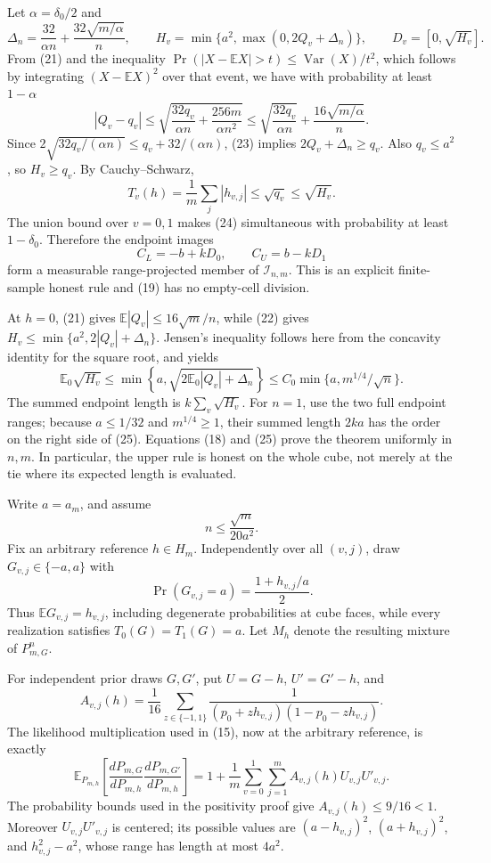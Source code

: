 Let \(\alpha=\delta_0/2\) and
\[
 \Delta_n=\frac{32}{\alpha n}+\frac{32\sqrt{m/\alpha}}n,
 \qquad
 H_v=\min\{a^2,\max(0,2Q_v+\Delta_n)\},
 \qquad D_v=[0,\sqrt{H_v}].                                             \tag{22}
\]
From (21) and the inequality
\(\Pr(|X-\mathbb EX|>t)\le\operatorname{Var}(X)/t^2\), which follows by
integrating \((X-\mathbb EX)^2\) over that event, we have with probability
at least \(1-\alpha\)
\[
 |Q_v-q_v|\le
 \sqrt{\frac{32q_v}{\alpha n}+\frac{256m}{\alpha n^2}}
 \le\sqrt{\frac{32q_v}{\alpha n}}+\frac{16\sqrt{m/\alpha}}n.            \tag{23}
\]
Since \(2\sqrt{32q_v/(\alpha n)}\le q_v+32/(\alpha n)\), (23) implies
\(2Q_v+\Delta_n\ge q_v\).  Also \(q_v\le a^2\), so \(H_v\ge q_v\).
By Cauchy--Schwarz,
\[
 T_v(h)=\frac1m\sum_j|h_{v,j}|\le\sqrt{q_v}\le\sqrt{H_v}.               \tag{24}
\]
The union bound over \(v=0,1\) makes (24) simultaneous with probability at
least \(1-\delta_0\).  Therefore the endpoint images
\[
 C_L=-b+kD_0,\qquad C_U=b-kD_1
\]
form a measurable range-projected member of \(\mathcal I_{n,m}\).  This is
an explicit finite-sample honest rule and (19) has no empty-cell division.

At \(h=0\), (21) gives \(\mathbb E|Q_v|\le16\sqrt m/n\), while (22) gives
\(H_v\le\min\{a^2,2|Q_v|+\Delta_n\}\).  Jensen's inequality follows here
from the concavity identity for the square root, and yields
\[
 \mathbb E_0\sqrt{H_v}
 \le\min\left\{a,\sqrt{2\mathbb E_0|Q_v|+\Delta_n}\right\}
 \le C_0\min\{a,m^{1/4}/\sqrt n\}.                                      \tag{25}
\]
The summed endpoint length is \(k\sum_v\sqrt{H_v}\).  For \(n=1\), use
the two full endpoint ranges; because \(a\le1/32\) and \(m^{1/4}\ge1\),
their summed length \(2ka\) has the order on the right side of (25).
Equations (18) and (25) prove the theorem uniformly in \(n,m\).  In
particular, the upper rule is honest on the whole cube, not merely at the
tie where its expected length is evaluated.

Write \(a=a_m\), and assume
\[
 n\le\frac{\sqrt m}{20a^2}.                                               \tag{26}
\]
Fix an arbitrary reference \(h\in H_m\).  Independently over all
\((v,j)\), draw \(G_{v,j}\in\{-a,a\}\) with
\[
 \Pr(G_{v,j}=a)=\frac{1+h_{v,j}/a}{2}.
\]
Thus \(\mathbb EG_{v,j}=h_{v,j}\), including degenerate probabilities at
cube faces, while every realization satisfies \(T_0(G)=T_1(G)=a\).  Let
\(M_h\) denote the resulting mixture of \(P_{m,G}^n\).

For independent prior draws \(G,G'\), put \(U=G-h\), \(U'=G'-h\), and
\[
 A_{v,j}(h)=\frac1{16}\sum_{z\in\{-1,1\}}
 \frac1{(p_0+zh_{v,j})(1-p_0-zh_{v,j})}.
\]
The likelihood multiplication used in (15), now at the arbitrary reference,
is exactly
\[
 \mathbb E_{P_{m,h}}
 \left[\frac{dP_{m,G}}{dP_{m,h}}
       \frac{dP_{m,G'}}{dP_{m,h}}\right]
 =1+\frac1m\sum_{v=0}^1\sum_{j=1}^m
 A_{v,j}(h)U_{v,j}U'_{v,j}.                                               \tag{27}
\]
The probability bounds used in the positivity proof give
\(A_{v,j}(h)\le9/16<1\).  Moreover \(U_{v,j}U'_{v,j}\) is centered; its
possible values are \((a-h_{v,j})^2\), \((a+h_{v,j})^2\), and
\(h_{v,j}^2-a^2\), whose range has length at most \(4a^2\).

